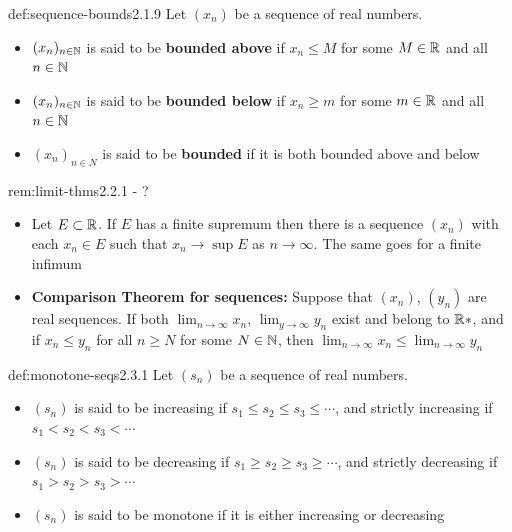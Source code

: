 \documentclass[landscape, 8pt]{extarticle}
\begin{document}
\begin{multicols}{3}
\begin{dfn}{def:sequence-bounds}{2.1.9}
Let $(x_{n})$ be a sequence of real numbers.
\vspace{-5pt}
\renewcommand\labelitemi{\tiny$\bullet$}
\begin{itemize}
    \setlength\itemsep{0em}
    \item $(x_{n})_{n\in \mathbb{N}}$ is said to be \textbf{bounded above} if $x_{n} \le M$ for some $M\in\mathbb{R}$ and all $n\in \mathbb{N}$
    \item $(x_{n})_{n\in \mathbb{N}}$ is said to be \textbf{bounded below} if $x_{n} \ge m$ for some $m\in\mathbb{R}$ and all $n\in \mathbb{N}$
    \item $(x_{n})_{n\in N}$ is said to be \textbf{bounded} if it is both bounded above and below
\end{itemize}
\end{dfn}
\vspace{-5pt}

\begin{rem}{rem:limit-thms}{2.2.1 - ?}
\renewcommand\labelitemi{\tiny$\bullet$}
\begin{itemize}
    \setlength\itemsep{0em}
    \item Let $E\subset \mathbb{R}$. If $E$ has a finite supremum then there is a sequence $(x_{n})$ with each $x_{n}\in E$ such that $x_{n}\to \sup E$ as $n\to \infty$. The same goes for a finite infimum
    \item \textbf{Comparison Theorem for sequences:} Suppose that $(x_{n})$, $(y_{n})$ are real sequences. If both $\lim_{n\to \infty} x_{n}$, $\lim_{y\to \infty} y_{n}$ exist and belong to $\mathbb{R}*$, and if $x_{n}\le y_{n}$ for all $n\ge N$ for some $N\in \mathbb{N}$, then $\lim_{n\to \infty} x_{n} \le \lim_{n\to \infty} y_{n}$
\end{itemize}
\end{rem}
\vspace{-5pt}

\begin{dfn}{def:monotone-seqs}{2.3.1}
    Let $(s_{n})$ be a sequence of real numbers.
    \renewcommand\labelitemi{\tiny$\bullet$}
    \begin{itemize}
        \setlength\itemsep{0em}
        \item $(s_{n})$ is said to be increasing if $s_{1}\le s_{2}\le s_{3}\le\cdots$, and strictly increasing if $s_{1}<s_{2}<s_{3}<\cdots$
        \item $(s_{n})$ is said to be decreasing if $s_{1}\ge s_{2}\ge s_{3}\ge\cdots$, and strictly decreasing if $s_{1}>s_{2}>s_{3}>\cdots$
        \item $(s_{n})$ is said to be monotone if it is either increasing or decreasing
    \end{itemize}
\end{dfn}
\vspace{-5pt}


\end{multicols}
\end{document}
